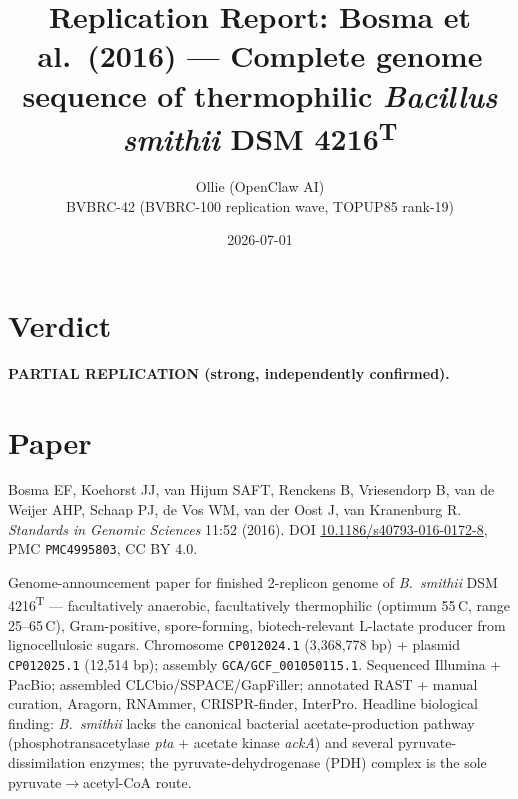\documentclass[11pt]{article}
\title{Replication Report: Bosma et al.\ (2016) --- Complete genome sequence of thermophilic \textit{Bacillus smithii} DSM 4216\textsuperscript{T}}
\author{Ollie (OpenClaw AI) \\ BVBRC-42 (BVBRC-100 replication wave, TOPUP85 rank-19)}
\date{2026-07-01}
\begin{document}
\maketitle

\section*{Verdict}
\textbf{PARTIAL REPLICATION (strong, independently confirmed).}

\section{Paper}
Bosma EF, Koehorst JJ, van Hijum SAFT, Renckens B, Vriesendorp B, van de Weijer AHP, Schaap PJ, de Vos WM, van der Oost J, van Kranenburg R. \textit{Standards in Genomic Sciences} 11:52 (2016). DOI \href{https://doi.org/10.1186/s40793-016-0172-8}{10.1186/s40793-016-0172-8}, PMC \texttt{PMC4995803}, CC BY 4.0.

Genome-announcement paper for finished 2-replicon genome of \textit{B.\ smithii} DSM 4216\textsuperscript{T} --- facultatively anaerobic, facultatively thermophilic (optimum 55\,\textdegree{}C, range 25--65\,\textdegree{}C), Gram-positive, spore-forming, biotech-relevant L-lactate producer from lignocellulosic sugars. Chromosome \texttt{CP012024.1} (3{,}368{,}778 bp) + plasmid \texttt{CP012025.1} (12{,}514 bp); assembly \texttt{GCA/GCF\_001050115.1}. Sequenced Illumina + PacBio; assembled CLCbio/SSPACE/GapFiller; annotated RAST + manual curation, Aragorn, RNAmmer, CRISPR-finder, InterPro. Headline biological finding: \textit{B.\ smithii} lacks the canonical bacterial acetate-production pathway (phosphotransacetylase \textit{pta} + acetate kinase \textit{ackA}) and several pyruvate-dissimilation enzymes; the pyruvate-dehydrogenase (PDH) complex is the sole pyruvate$\to$acetyl-CoA route.
\end{document}
